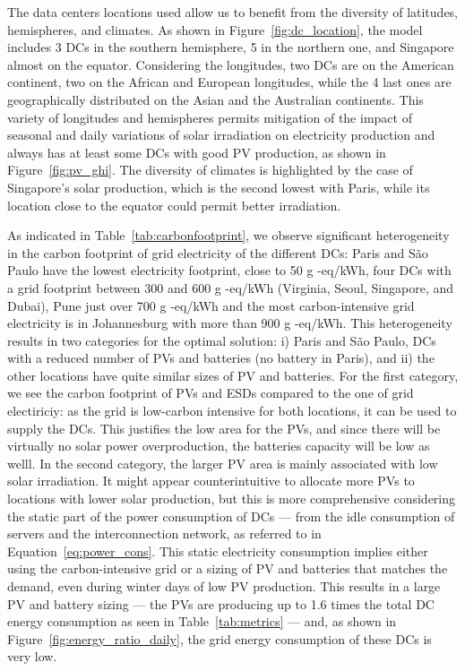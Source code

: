 The data centers locations used allow us to benefit from the diversity of latitudes, hemispheres, and climates. As shown in Figure~\ref{fig:dc_location}, the model includes 3 DCs in the southern hemisphere, 5 in the northern one, and Singapore almost on the equator. Considering the longitudes, two DCs are on the American continent, two on the African and European longitudes, while the 4 last ones are geographically distributed on the Asian and the Australian continents. This variety of longitudes and hemispheres permits mitigation of the impact of seasonal and daily variations of solar irradiation on electricity production and always has at least some DCs with good PV production, as shown in Figure~\ref{fig:pv_ghi}. The diversity of climates is highlighted by the case of Singapore's solar production, which is the second lowest with Paris, while its location close to the equator could permit better irradiation.


As indicated in Table~\ref{tab:carbonfootprint}, we observe significant heterogeneity in the carbon footprint of grid electricity of the different DCs: Paris and S\~ao Paulo have the lowest electricity footprint, close to 50 g -eq/kWh, four DCs with a grid footprint between 300 and 600 g -eq/kWh (Virginia, Seoul, Singapore, and Dubai), Pune just over 700 g -eq/kWh and the most carbon-intensive grid electricity is in Johannesburg with more than 900 g -eq/kWh. This heterogeneity results in two categories for the optimal solution: i) Paris and S\~ao Paulo, DCs with a reduced number of PVs and batteries (no battery in Paris), and ii) the other locations have quite similar sizes of PV and batteries. For the first category, we see the carbon footprint of PVs and ESDs compared to the one of grid electiriciy: as the grid is low-carbon intensive for both locations, it can be used to supply the DCs. This justifies the low area for the PVs, and since there will be virtually no solar power overproduction, the batteries capacity will be low as welll. In the second category, the larger PV area is mainly associated with low solar irradiation. It might appear counterintuitive to allocate more PVs to locations with lower solar production, but this is more comprehensive considering the static part of the power consumption of DCs  --- from the idle consumption of servers and the interconnection network, as referred to in Equation~\eqref{eq:power_cons}. This static electricity consumption implies either using the carbon-intensive grid or a sizing of PV and batteries that matches the demand, even during winter days of low PV production. This results in a large PV and battery sizing --- the PVs are producing up to 1.6 times the total DC energy consumption as seen in Table~\ref{tab:metrics} --- and, as shown in Figure~\ref{fig:energy_ratio_daily}, the grid energy consumption of these DCs is very low. 

